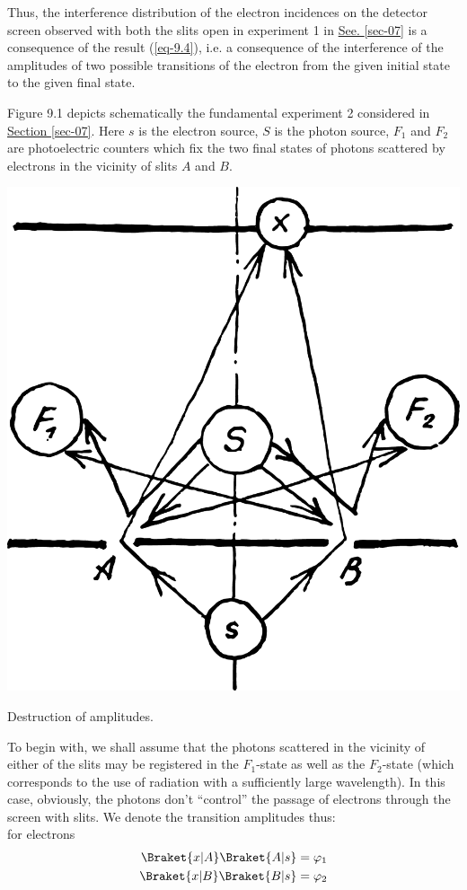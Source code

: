 \documentclass[a4paper,sfsidenotes,colorlinks=true]{tufte-book}
\numberwithin{equation}{section}
\numberwithin{figure}{section}
\begin{document}
Thus, the interference distribution of the electron incidences on the detector screen observed with both the slits open in experiment 1 in \hyperref[sec-07]{See. \ref{sec-07}} is a consequence of the result (\ref{eq-9.4}), i.e. a consequence of the interference of the amplitudes of two possible transitions of the electron from the given initial state to the given final state.


Figure 9.1  depicts schematically the fundamental experiment 2
considered in \hyperref[sec-07]{Section \ref{sec-07}}. Here $s$ is the
electron source, $S$ is the photon source, $F_{1}$ and $F_{2}$ are
photoelectric counters which fix the two final states of photons
scattered by electrons in the vicinity of slits $A$ and $B$. 
\begin{marginfigure}[1cm]
\centering
\includegraphics[width=\textwidth]{figures/fig-09-01.pdf}
\caption{Destruction of amplitudes.}
\label{fig-9.1}
\end{marginfigure}

To begin with, we shall assume that the photons scattered in the
vicinity of either of the slits may be registered in the $F_{1}$-state as
well as the $F_{2}$-state (which corresponds to the use of radiation with
a sufficiently large wavelength). In this case, obviously, the photons
don't ``control'' the passage of electrons through the screen with
slits. We denote the transition amplitudes thus: \\[5pt]
for electrons
\begin{equation}%
\begin{split}
\Braket{x|A}\Braket{A|s} & = \varphi_{1} \\
\Braket{x|B}\Braket{B|s} & = \varphi_{2} 
\end{split}
\label{eq-9.5}
\end{equation}
\end{document}
